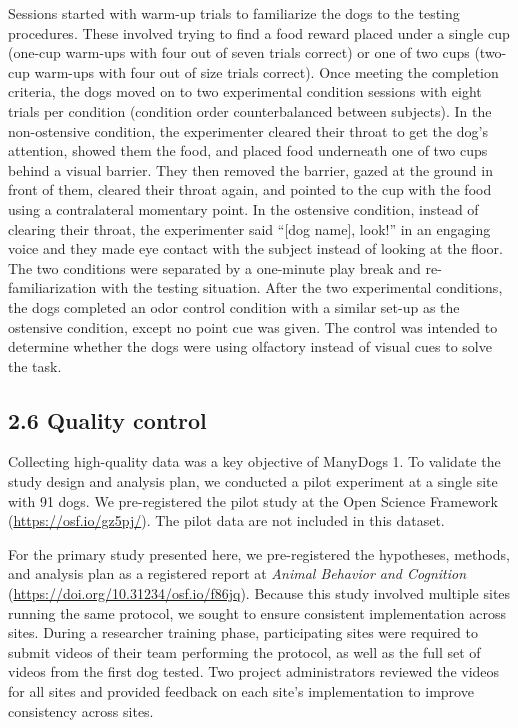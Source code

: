 \documentclass[
  man,floatsintext]{apa6}
\begin{document}
Sessions started with warm-up trials to familiarize the dogs to the testing procedures. These involved trying to find a food reward placed under a single cup (one-cup warm-ups with four out of seven trials correct) or one of two cups (two-cup warm-ups with four out of size trials correct). Once meeting the completion criteria, the dogs moved on to two experimental condition sessions with eight trials per condition (condition order counterbalanced between subjects). In the non-ostensive condition, the experimenter cleared their throat to get the dog's attention, showed them the food, and placed food underneath one of two cups behind a visual barrier. They then removed the barrier, gazed at the ground in front of them, cleared their throat again, and pointed to the cup with the food using a contralateral momentary point. In the ostensive condition, instead of clearing their throat, the experimenter said ``{[}dog name{]}, look!'' in an engaging voice and they made eye contact with the subject instead of looking at the floor. The two conditions were separated by a one-minute play break and re-familiarization with the testing situation. After the two experimental conditions, the dogs completed an odor control condition with a similar set-up as the ostensive condition, except no point cue was given. The control was intended to determine whether the dogs were using olfactory instead of visual cues to solve the task.

\hypertarget{quality-control}{%
\subsection{2.6 Quality control}\label{quality-control}}

Collecting high-quality data was a key objective of ManyDogs 1. To validate the study design and analysis plan, we conducted a pilot experiment at a single site with 91 dogs. We pre-registered the pilot study at the Open Science Framework (\url{https://osf.io/gz5pj/}). The pilot data are not included in this dataset.

For the primary study presented here, we pre-registered the hypotheses, methods, and analysis plan as a registered report at \emph{Animal Behavior and Cognition} (\url{https://doi.org/10.31234/osf.io/f86jq}). Because this study involved multiple sites running the same protocol, we sought to ensure consistent implementation across sites. During a researcher training phase, participating sites were required to submit videos of their team performing the protocol, as well as the full set of videos from the first dog tested. Two project administrators reviewed the videos for all sites and provided feedback on each site's implementation to improve consistency across sites.
\end{document}
